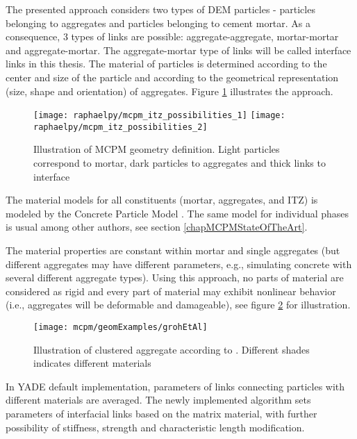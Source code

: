 The presented approach considers two types of DEM particles - particles belonging to aggregates and particles belonging to cement mortar.
As a consequence, 3 types of links are possible: aggregate-aggregate, mortar-mortar and aggregate-mortar.
The aggregate-mortar type of links will be called interface links in this thesis.
The material of particles is determined according to the center and size of the particle and according to the geometrical representation (size, shape and orientation) of aggregates.
Figure \ref{figMCPMItzPossibilities} illustrates the approach.
\begin{figure}[htbp]
	\centering
	\texttt{[image: raphaelpy/mcpm\_itz\_possibilities\_1]}
	\hspace{2em}
	\texttt{[image: raphaelpy/mcpm\_itz\_possibilities\_2]}
	\caption[Illustration of MCPM geometry definition]{Illustration of MCPM geometry definition. Light particles correspond to mortar, dark particles to aggregates and thick links to interface}
	\label{figMCPMItzPossibilities}
\end{figure}

The material models for all constituents (mortar, aggregates, and ITZ) is modeled by the Concrete Particle Model \cite{Smilauer2010a}.
The same model for individual phases is usual among other authors, see section \ref{chapMCPMStateOfTheArt}.

The material properties are constant within mortar and single aggregates (but different aggregates may have different parameters, e.g., simulating concrete with several different aggregate types).
Using this approach, no parts of material are considered as rigid and every part of material may exhibit nonlinear behavior (i.e., aggregates will be deformable and damageable), see figure \ref{figMCPMClusteredAggregateIllustration} for illustration.
\begin{figure}[ht]
	\centering
	\texttt{[image: mcpm/geomExamples/grohEtAl]}
	\caption[Illustration of clustered aggregate]{Illustration of clustered aggregate according to \cite{GrohKonietzkyWalterHerbst2011a}. Different shades indicates different materials}
	\label{figMCPMClusteredAggregateIllustration}
\end{figure}

In YADE default implementation, parameters of links connecting particles with different materials are averaged.
The newly implemented algorithm sets parameters of interfacial links based on the matrix material, with further possibility of stiffness, strength and characteristic length modification.

